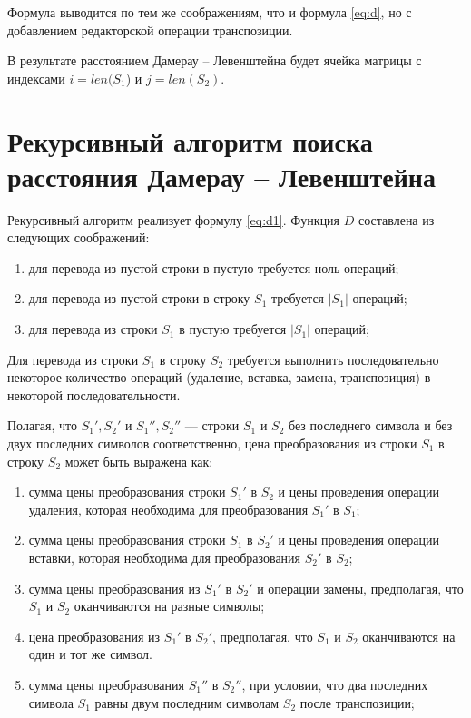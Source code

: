 Формула выводится по тем же соображениям, что и формула \ref{eq:d}, но с добавлением редакторской операции транспозиции.

В результате расстоянием Дамерау -- Левенштейна будет ячейка матрицы с индексами $i = len(S_{1}$) и $j = len(S_{2})$.

\section{Рекурсивный алгоритм поиска расстояния Дамерау -- Левенштейна}

Рекурсивный алгоритм реализует формулу \ref{eq:d1}.
Функция $D$ составлена из следующих соображений:
\begin{enumerate}[label={\arabic*)}]
	\item для перевода из пустой строки в пустую требуется ноль операций;
	\item для перевода из пустой строки в строку $S_{1}$ требуется $|S_{1}|$ операций;
	\item для перевода из строки $S_{1}$ в пустую требуется $|S_{1}|$ операций;
\end{enumerate}

Для перевода из строки $S_{1}$ в строку $S_{2}$ требуется выполнить последовательно некоторое количество операций (удаление, вставка, замена, транспозиция) в некоторой последовательности. 

Полагая, что $S_{1}', S_{2}'$  и $S_{1}'', S_{2}''$ — строки $S_{1}$ и $S_{2}$ без последнего символа и без двух последних символов соответственно, цена преобразования из строки $S_{1}$ в строку $S_{2}$ может быть выражена как:
\begin{enumerate}[label={\arabic*)}]
	\item сумма цены преобразования строки $S_{1}'$ в $S_{2}$ и цены проведения операции удаления, которая необходима для преобразования $S_{1}'$ в $S_{1}$;
	\item сумма цены преобразования строки $S_{1}$ в $S_{2}'$  и цены проведения операции вставки, которая необходима для преобразования $S_{2}'$ в $S_{2}$;
	\item сумма цены преобразования из $S_{1}'$ в $S_{2}'$ и операции замены, предполагая, что $S_{1}$ и $S_{2}$ оканчиваются на разные символы;
	\item цена преобразования из $S_{1}'$ в $S_{2}'$, предполагая, что $S_{1}$ и $S_{2}$ оканчиваются на один и тот же символ.
	\item сумма цены преобразования $S_{1}''$ в $S_{2}''$, при условии, что два последних символа $S_{1}$ равны двум последним символам $S_{2}$ после транспозиции;
\end{enumerate}

